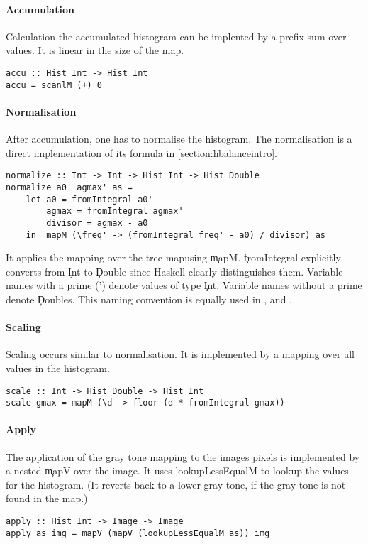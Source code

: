   \paragraph{Accumulation}
  Calculation the accumulated histogram can be implented by
  a prefix sum over values. It is linear in the size of the map.
  \begin{lstlisting}
accu :: Hist Int -> Hist Int
accu = scanlM (+) 0
  \end{lstlisting}
    
  \paragraph{Normalisation}
  After accumulation, one has to normalise the histogram.
  The normalisation is a direct implementation of its formula in
  \ref{section:hbalanceintro}.
  \begin{lstlisting}
normalize :: Int -> Int -> Hist Int -> Hist Double
normalize a0' agmax' as =
    let a0 = fromIntegral a0'
        agmax = fromIntegral agmax'
        divisor = agmax - a0
    in  mapM (\freq' -> (fromIntegral freq' - a0) / divisor) as
  \end{lstlisting}
  It applies the mapping over the tree-mapusing \c{mapM}.
  \c{fromIntegral} explicitly converts from \c{Int} to \c{Double} since
  Haskell clearly distinguishes them. Variable names with a prime
  (') denote values of type \c{Int}. Variable names without a prime
  denote \c{Double}s. This naming convention is equally used in
  \man, \ndpn and \ndpv.
    
  \paragraph{Scaling}
  Scaling occurs similar to normalisation. It is implemented
  by a mapping over all values in the histogram.
  \begin{lstlisting}
scale :: Int -> Hist Double -> Hist Int
scale gmax = mapM (\d -> floor (d * fromIntegral gmax))
  \end{lstlisting}
    
  \paragraph{Apply}
  The application of the gray tone mapping to the images pixels
  is implemented by a nested \c{mapV} over the image. It uses
  \c{lookupLessEqualM} to lookup the values for the histogram.
  (It reverts back to a lower gray tone, if the gray tone is not found in the map.)
  \begin{lstlisting}
apply :: Hist Int -> Image -> Image
apply as img = mapV (mapV (lookupLessEqualM as)) img
  \end{lstlisting}
  
